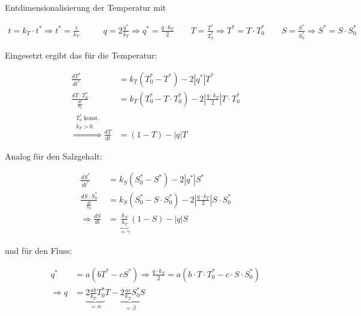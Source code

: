 \documentclass[a4paper,twoside]{article}
\begin{document}
	\noindent Entdimensionalisierung der Temperatur mit 
	\begin{footnotesize}
	\begin{align*}
		t = k_T \cdot t^* \Rightarrow t^* = \frac{t}{k_T} &\qquad
		q = 2\frac{q^*}{k_T} \Rightarrow q^* = \frac{q \cdot k_T}{2} \qquad
		T = \frac{T^*}{T^*_0} \Rightarrow T^* = T \cdot T^*_0 \qquad
		S = \frac{S^*}{S^*_0} \Rightarrow S^* = S \cdot S^*_0
	\end{align*}
	\end{footnotesize}
	Eingesetzt ergibt das für die Temperatur:
	\begin{footnotesize}
	\begin{align*}
		\frac{dT^*}{dt^*} &= k_T\left(T^*_{0} - T^*\right) - 2\left|q^*\right|T^* \\
		\frac{dT \cdot T^*_0}{\frac{dt}{k_T}} &= 
		k_T\left(T^*_{0} - T \cdot T^*_0 \right) - 2\left|\frac{q \cdot k_T}{2}\right|T \cdot T^*_0 \\
		\stackrel{\substack{
			T^*_{0} \textrm{ konst.}\\
			k_T > 0
		}}{\Rightarrow} \frac{dT}{dt} &=
		\left(1 - T\right) - \left|q\right|T
	\end{align*}
	\end{footnotesize}
	Analog für den Salzgehalt:
	\begin{footnotesize}
	\begin{align*}	
		\frac{dS^*}{dt^*} &= k_S\left(S^*_{0} - S^*\right) - 2\left|q^*\right|S^* \\
		\frac{dS \cdot S^*_0}{\frac{dt}{k_T}} &= k_S\left(S^*_{0} - S \cdot S^*_0\right) - 2\left|\frac{q \cdot k_T}{2}\right|S \cdot S^*_0 \\
		\Rightarrow \frac{dS}{dt} &= \underbrace{\frac{k_S}{k_T}}_{=\gamma}\left(1 - S\right) - \left|q\right|S
	\end{align*}
	\end{footnotesize}
	und für den Fluss:
	\begin{footnotesize}
	\begin{align*}
		q^* &= a \left( bT^* - cS^* \right)
		\Rightarrow \frac{q \cdot k_T}{2} = a\left(b \cdot T \cdot T^*_0 - c \cdot S \cdot S^*_0 \right) \\
		\Rightarrow q &= \underbrace{2\frac{ab}{k_T}T^*_0}_{=\alpha}T - \underbrace{2\frac{ac}{k_T}S^*_0}_{=\beta}S
	\end{align*}
	\end{footnotesize}
	
\end{document}
